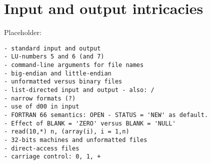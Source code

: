 \section{Input and output intricacies}
Placeholder:
\begin{verbatim}
- standard input and output
- LU-numbers 5 and 6 (and 7)
- command-line arguments for file names
- big-endian and little-endian
- unformatted versus binary files
- list-directed input and output - also: /
- narrow formats (?)
- use of d00 in input
- FORTRAN 66 semantics: OPEN - STATUS = 'NEW' as default.
- Effect of BLANK = 'ZERO' versus BLANK = 'NULL'
- read(10,*) n, (array(i), i = 1,n)
- 32-bits machines and unformatted files
- direct-access files
- carriage control: 0, 1, +
\end{verbatim}


